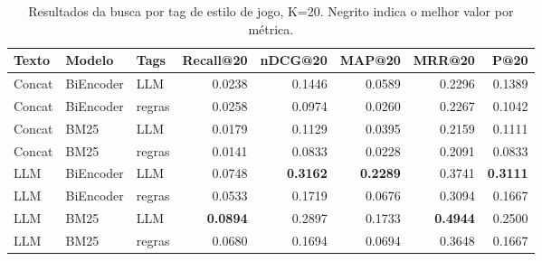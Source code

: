 \begin{table}[h]
\centering
\caption{Resultados da busca por tag de estilo de jogo, K=20. Negrito indica o melhor valor por métrica.}
\label{tab:tag-search-k20}
\begin{tabular}{lllrrrrr}
\toprule
Texto & Modelo & Tags & Recall@20 & nDCG@20 & MAP@20 & MRR@20 & P@20 \\
\midrule
Concat & BiEncoder & LLM & 0.0238 & 0.1446 & 0.0589 & 0.2296 & 0.1389 \\
Concat & BiEncoder & regras & 0.0258 & 0.0974 & 0.0260 & 0.2267 & 0.1042 \\
Concat & BM25 & LLM & 0.0179 & 0.1129 & 0.0395 & 0.2159 & 0.1111 \\
Concat & BM25 & regras & 0.0141 & 0.0833 & 0.0228 & 0.2091 & 0.0833 \\
LLM & BiEncoder & LLM & 0.0748 & \textbf{0.3162} & \textbf{0.2289} & 0.3741 & \textbf{0.3111} \\
LLM & BiEncoder & regras & 0.0533 & 0.1719 & 0.0676 & 0.3094 & 0.1667 \\
LLM & BM25 & LLM & \textbf{0.0894} & 0.2897 & 0.1733 & \textbf{0.4944} & 0.2500 \\
LLM & BM25 & regras & 0.0680 & 0.1694 & 0.0694 & 0.3648 & 0.1667 \\
\bottomrule
\end{tabular}
\end{table}
